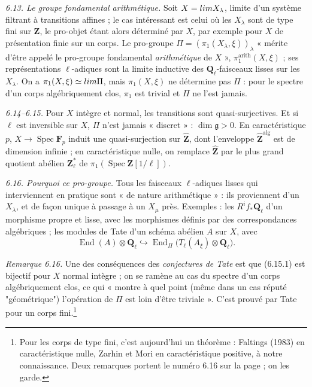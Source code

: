 \documentclass[11pt,a4paper]{article}
\begin{document}
\emph{6.13. Le groupe fondamental arithmétique.} Soit $X = \varprojlim X_\lambda$,
limite d'un système filtrant à transitions affines ; le cas intéressant est
celui où les $X_\lambda$ sont de type fini sur $\mathbf{Z}$, le pro-objet étant
alors déterminé par $X$, par exemple pour $X$ de présentation finie sur un
corps. Le pro-groupe $\Pi = (\pi_1(X_\lambda, \xi))_\lambda$ « mérite d'être
appelé le pro-groupe fondamental \emph{arithmétique} de $X$ »,
$\pi_1^{\mathrm{arith}}(X, \xi)$ ; ses représentations $\ell$-adiques sont la
limite inductive des $\mathbf{Q}_\ell$-faisceaux lisses sur les $X_\lambda$. On
a $\pi_1(X, \xi) \simeq \varprojlim \Pi$, mais $\pi_1(X,\xi)$ ne détermine pas
$\Pi$ : pour le spectre d'un corps algébriquement clos, $\pi_1$ est trivial et
$\Pi$ ne l'est jamais.

\emph{6.14--6.15.} Pour $X$ intègre et normal, les transitions sont
quasi-surjectives. Et si $\ell$ est inversible sur $X$, $\Pi$ n'est jamais
« discret » : $\dim \mathfrak{g} > 0$. En caractéristique $p$, $X \to
\operatorname{Spec}\mathbf{F}_p$ induit une quasi-surjection sur
$\widehat{\mathbf{Z}}$, dont l'enveloppe $\widehat{\mathbf{Z}}^{\mathrm{alg}}$ est
de dimension infinie ; en caractéristique nulle, on remplace
$\widehat{\mathbf{Z}}$ par le plus grand quotient abélien
$\mathbf{Z}_\ell^*$ de $\pi_1(\operatorname{Spec}\mathbf{Z}[1/\ell])$.

\emph{6.16. Pourquoi ce pro-groupe.} Tous les faisceaux $\ell$-adiques lisses qui
interviennent en pratique sont « de nature arithmétique » : ils proviennent d'un
$X_\lambda$, et de façon unique à passage à un $X_\mu$ près. Exemples : les
$R^i f_*\mathbf{Q}_\ell$ d'un morphisme propre et lisse, avec les morphismes
définis par des correspondances algébriques ; les modules de Tate d'un schéma
abélien $A$ sur $X$, avec
\[
  \operatorname{End}(A) \otimes \mathbf{Q}_\ell \hookrightarrow
  \operatorname{End}_\Pi\bigl(T_\ell(A_\xi) \otimes \mathbf{Q}_\ell\bigr). \tag{6.15.1}
\]

\emph{Remarque 6.16.} Une des conséquences des \emph{conjectures de Tate} est que
(6.15.1) est bijectif pour $X$ normal intègre ; on se ramène au cas du spectre
d'un corps algébriquement clos, ce qui « montre à quel point (même dans un cas
réputé "géométrique") l'opération de $\Pi$ est loin d'être triviale ». C'est
prouvé par Tate pour un corps fini.\footnote{Pour les corps de type fini, c'est
aujourd'hui un théorème : Faltings (1983) en caractéristique nulle, Zarhin et
Mori en caractéristique positive, à notre connaissance. Deux remarques portent le
numéro 6.16 sur la page ; on les garde.}
\end{document}
